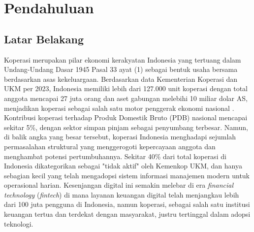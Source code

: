 \chapter{Pendahuluan}
\label{ch1}

\section{Latar Belakang}

Koperasi merupakan pilar ekonomi kerakyatan Indonesia yang tertuang dalam Undang-Undang Dasar 1945 Pasal 33 ayat (1) sebagai bentuk usaha bersama berdasarkan asas kekeluargaan. Berdasarkan data Kementerian Koperasi dan UKM per 2023, Indonesia memiliki lebih dari 127.000 unit koperasi dengan total anggota mencapai 27 juta orang dan aset gabungan melebihi 10 miliar dolar AS, menjadikan koperasi sebagai salah satu motor penggerak ekonomi nasional \cite{sailana2023pengaruh}. Kontribusi koperasi terhadap Produk Domestik Bruto (PDB) nasional mencapai sekitar 5\%, dengan sektor simpan pinjam sebagai penyumbang terbesar. Namun, di balik angka yang besar tersebut, koperasi Indonesia menghadapi sejumlah permasalahan struktural yang menggerogoti kepercayaan anggota dan menghambat potensi pertumbuhannya. Sekitar 40\% dari total koperasi di Indonesia dikategorikan sebagai "tidak aktif" oleh Kemenkop UKM, dan hanya sebagian kecil yang telah mengadopsi sistem informasi manajemen modern untuk operasional harian. Kesenjangan digital ini semakin melebar di era \textit{financial technology} (\textit{fintech}) di mana layanan keuangan digital telah menjangkau lebih dari 100 juta pengguna di Indonesia, namun koperasi, sebagai salah satu institusi keuangan tertua dan terdekat dengan masyarakat, justru tertinggal dalam adopsi teknologi.

